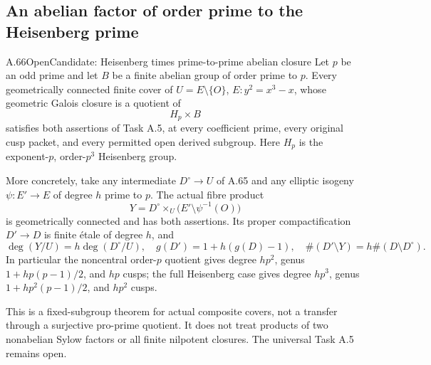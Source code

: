 \subsection{An abelian factor of order prime to the Heisenberg prime}

\begin{statement}{A.66}{Open}{Candidate: Heisenberg times prime-to-prime abelian closure}
Let \(p\) be an odd prime and let \(B\) be a finite abelian group
of order prime to \(p\). Every geometrically connected finite
cover of \(U=E\setminus\{O\}\), \(E:y^2=x^3-x\), whose geometric
Galois closure is a quotient of
\[
                         H_p\times B
\]
satisfies both assertions of Task A.5, at every coefficient
prime, every original cusp packet, and every permitted open
derived subgroup. Here \(H_p\) is the exponent-\(p\), order-\(p^3\)
Heisenberg group.

More concretely, take any intermediate \(D^\circ\to U\) of
A.65 and any elliptic isogeny \(\psi:E'\to E\) of degree \(h\)
prime to \(p\). The actual fibre product
\[
 Y=D^\circ\times_U
       \bigl(E'\setminus\psi^{-1}(O)\bigr)
                                                               \tag{A.66.1}
\]
is geometrically connected and has both assertions. Its proper
compactification \(D'\to D\) is finite étale of degree \(h\), and
\[
 \deg(Y/U)=h\deg(D^\circ/U),\quad
 g(D')=1+h(g(D)-1),\quad
 \#(D'\setminus Y)=h\#(D\setminus D^\circ).
                                                               \tag{A.66.2}
\]
In particular the noncentral order-\(p\) quotient gives degree
\(hp^2\), genus \(1+hp(p-1)/2\), and \(hp\) cusps; the full
Heisenberg case gives degree \(hp^3\), genus
\(1+hp^2(p-1)/2\), and \(hp^2\) cusps.

This is a fixed-subgroup theorem for actual composite covers,
not a transfer through a surjective pro-prime quotient. It does
not treat products of two nonabelian Sylow factors or all finite
nilpotent closures. The universal Task A.5 remains open.
\end{statement}

